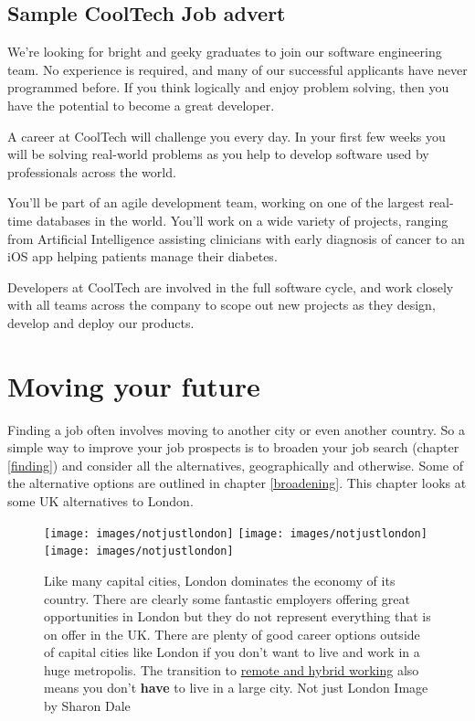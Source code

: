\documentclass[
]{book}
\begin{document}
\hypertarget{cooltech}{%
\section{Sample CoolTech Job advert}\label{cooltech}}

We're looking for bright and geeky graduates to join our software engineering team. No experience is required, and many of our successful applicants have never programmed before. If you think logically and enjoy problem solving, then you have the potential to become a great developer.

A career at CoolTech will challenge you every day. In your first few weeks you will be solving real-world problems as you help to develop software used by professionals across the world.

You'll be part of an agile development team, working on one of the largest real-time databases in the world. You'll work on a wide variety of projects, ranging from Artificial Intelligence assisting clinicians with early diagnosis of cancer to an iOS app helping patients manage their diabetes.

Developers at CoolTech are involved in the full software cycle, and work closely with all teams across the company to scope out new projects as they design, develop and deploy our products.

\hypertarget{moving}{%
\chapter{Moving your future}\label{moving}}

Finding a job often involves moving to another city or even another country. So a simple way to improve your job prospects is to broaden your job search (chapter \ref{finding}) and consider all the alternatives, geographically and otherwise. Some of the alternative options are outlined in chapter \ref{broadening}. This chapter looks at some UK alternatives to London.

\begin{figure}
\texttt{[image: images/notjustlondon]} \texttt{[image: images/notjustlondon]} \texttt{[image: images/notjustlondon]} \caption{Like many capital cities, London dominates the economy of its country. There are clearly some fantastic employers offering great opportunities in London but they do not represent everything that is on offer in the UK. There are plenty of good career options outside of capital cities like London if you don't want to live and work in a huge metropolis. The transition to \href{https://en.wikipedia.org/wiki/Remote_work}{remote and hybrid working} also means you don't \textbf{have} to live in a large city. Not just London Image by Sharon Dale \citep{notjustlondon}}\label{fig:northern-fig}
\end{figure}
\end{document}
